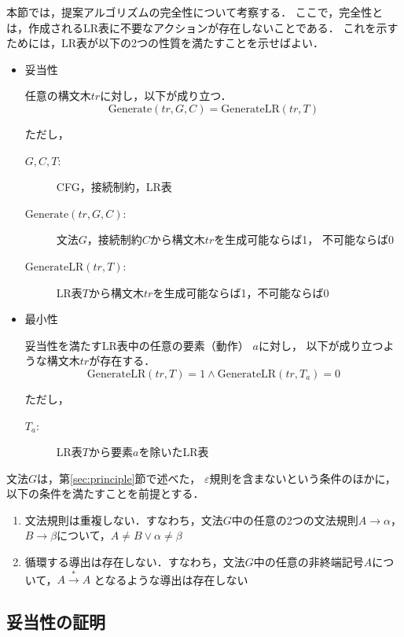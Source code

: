 \documentclass[japanese]{jnlp_1.4}
\begin{document}
本節では，提案アルゴリズムの完全性について考察する．
ここで，完全性とは，作成されるLR表に不要なアクションが存在しないことである．
これを示すためには，LR表が以下の2つの性質を満たすことを示せばよい．
\begin{itemize}
\item 妥当性

  任意の構文木$\mathit{tr}$に対し，以下が成り立つ．
\[
    \mathrm{Generate}(\mathit{tr}, G, C) = \mathrm{GenerateLR}(\mathit{tr}, T) 
\]

  ただし，
  \begin{description}
  \item[$G,C,T$:] CFG，接続制約，LR表
  \item[$\mathrm{Generate}(\mathit{tr},G,C)$:]
    文法$G$，接続制約$C$から構文木$\mathit{tr}$を生成可能ならば1，
    不可能ならば0
  \item[$\mathrm{GenerateLR}(\mathit{tr},T)$:]
    LR表$T$から構文木$\mathit{tr}$を生成可能ならば1，不可能ならば0
  \end{description}
\item 最小性

  妥当性を満たすLR表中の任意の要素（動作） $a$に対し，
  以下が成り立つような構文木$\mathit{tr}$が存在する．
\[
    \mathrm{GenerateLR}(\mathit{tr}, T) = 1  \wedge \mathrm{GenerateLR}(\mathit{tr}, T_a) = 0
\]

  ただし，
  \begin{description}
  \item[$T_a$:] LR表$T$から要素$a$を除いたLR表
  \end{description}
\end{itemize}

文法$G$は，第\ref{sec:principle}節で述べた，
$\varepsilon$規則を含まないという条件のほかに，
以下の条件を満たすことを前提とする．
\begin{enumerate}
\item 文法規則は重複しない．すなわち，文法$G$中の任意の2つの文法規則$A\to\alpha$，$B\to\beta$について，$A\neq B\vee\alpha\neq\beta$
\item 循環する導出は存在しない．すなわち，文法$G$中の任意の非終端記号$A$について，$A\stackrel{\ast}{\to}A$ となるような導出は存在しない
\end{enumerate}


\subsection{妥当性の証明}
\end{document}
